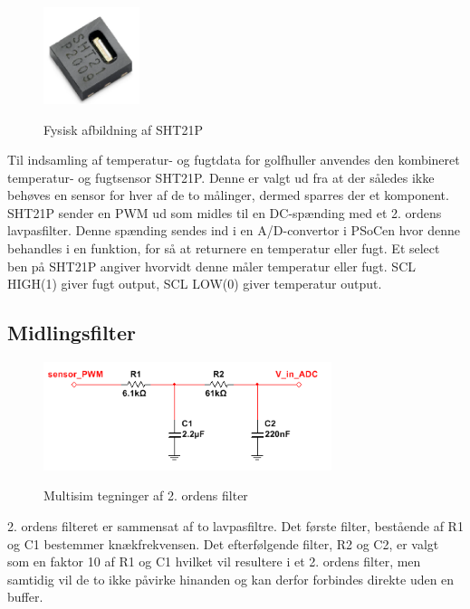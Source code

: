 
\begin{figure}[htb]
\centering
{\includegraphics[width=0.25\textwidth]{filer/design/Billeder/sht21p_fysisk.png}}
\caption{Fysisk afbildning af SHT21P}
\label{lab:sht_filter}
\end{figure}

Til indsamling af temperatur- og fugtdata for golfhuller anvendes den kombineret temperatur- og fugtsensor SHT21P. Denne er valgt ud fra at der således ikke behøves en sensor for hver af de to målinger, dermed sparres der et komponent. SHT21P sender en PWM ud som midles til en DC-spænding med et 2. ordens lavpasfilter. Denne spænding sendes ind i en A/D-convertor i PSoCen hvor denne behandles i en funktion, for så at returnere en temperatur eller fugt. Et select ben på SHT21P angiver hvorvidt denne måler temperatur eller fugt. SCL HIGH(1) giver fugt output, SCL LOW(0) giver temperatur output.

\subsection{Midlingsfilter}
\begin{figure}[htb]
\centering
{\includegraphics[width=0.75\textwidth]{filer/design/Billeder/sht21p_filter_pic.png}}
\caption{Multisim tegninger af 2. ordens filter}
\label{lab:sht_filter_pic}
\end{figure}

2. ordens filteret er sammensat af to lavpasfiltre. Det første filter, bestående af R1 og C1 bestemmer knækfrekvensen. Det efterfølgende filter, R2 og C2, er valgt som en faktor 10 af R1 og C1 hvilket vil resultere i et 2. ordens filter, men samtidig vil de to ikke påvirke hinanden og kan derfor forbindes direkte uden en buffer. 

